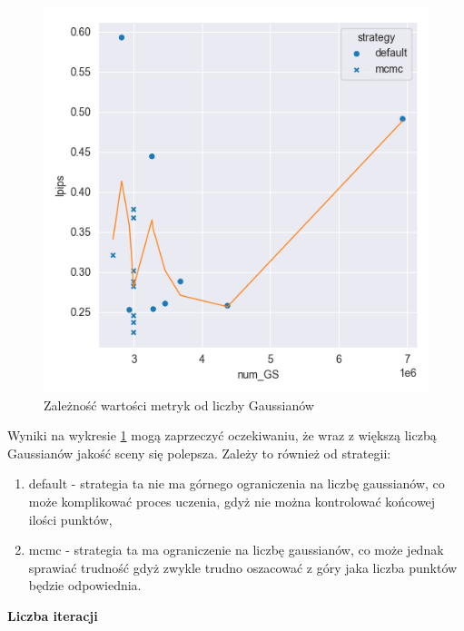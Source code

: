 \begin{figure}[h!]
\begin{minipage}{0.3\textwidth}
    \end{minipage}
    \hfill
    \begin{minipage}{0.3\textwidth}
        \centering
        \includegraphics[width=\textwidth]{img/gs_metrics/lpips_num_GS.png}
    \end{minipage}
    \caption{Zależność wartości metryk od liczby Gaussianów}
    \label{fig:num_gs_metrics}
\end{figure}

Wyniki na wykresie \ref{fig:num_gs_metrics} mogą zaprzeczyć oczekiwaniu, że wraz z większą liczbą Gaussianów jakość sceny się polepsza. Zależy to również od strategii:
\begin{enumerate}
    \item default - strategia ta nie ma górnego ograniczenia na liczbę gaussianów, co może komplikować proces uczenia, gdyż nie można kontrolować końcowej ilości punktów,
    \item mcmc - strategia ta ma ograniczenie na liczbę gaussianów, co może jednak sprawiać trudność gdyż zwykle trudno oszacować z góry jaka liczba punktów będzie odpowiednia.
\end{enumerate}

\textbf{Liczba iteracji}

